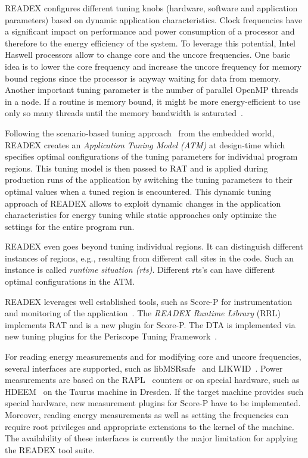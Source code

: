 \documentclass[runningheads]{llncs}
\begin{document}
READEX configures different tuning knobs (hardware, software and application parameters) based on dynamic application characteristics. Clock frequencies have a significant impact on performance and power consumption of a processor and therefore to the energy efficiency of the system. To leverage this potential, Intel Haswell processors allow to change core and the uncore frequencies. One basic idea is to lower the core frequency and increase the uncore frequency for memory bound regions since the processor is anyway waiting for data from memory. Another important tuning parameter is the number of parallel OpenMP threads in a node. If a routine is memory bound, it might be more energy-efficient to use only so many threads until the memory bandwidth is saturated~\cite{rs_hotpower12}.

Following the scenario-based tuning approach~\cite{filippopoulos2013exploration} from the embedded world, READEX creates an \textit{Application Tuning Model (ATM)} at design-time which specifies optimal configurations of the tuning parameters for individual program regions. This tuning model is then passed to RAT and is applied during production runs of the application by switching the tuning parameters to their optimal values when a tuned region is encountered. This dynamic tuning approach of READEX allows to exploit dynamic changes in the application characteristics for energy tuning while static approaches only optimize the settings for the entire program run. 

READEX even goes beyond tuning individual regions. It can distinguish different instances of regions, e.g., resulting from different call sites in the code. Such an instance is called \textit{runtime situation (rts)}. Different rts's can have different optimal configurations in the ATM. 

READEX leverages well established tools, such as Score-P for instrumentation and monitoring of the application~\cite{knupfer2012score}. The \textit{READEX Runtime Library} (RRL) implements RAT and is a new plugin for Score-P. The DTA is implemented via new tuning plugins for the Periscope Tuning Framework~\cite{PTF2.0IEEE2016}.  

For reading energy measurements and for modifying core and uncore frequencies, several interfaces are supported, such as libMSRsafe~\cite{msrsave} and LIKWID~\cite{LIKWID}. Power measurements are based on the RAPL~\cite{Intel2018} counters or on special hardware, such as HDEEM~\cite{hdeem} on the Taurus machine in Dresden. If the target machine provides such special hardware, new measurement plugins for Score-P have to be implemented. Moreover, reading energy measurements as well as setting the frequencies can require root privileges and appropriate extensions to the kernel of the machine. The availability of these interfaces is currently the major limitation for applying the READEX tool suite. 
\end{document}
